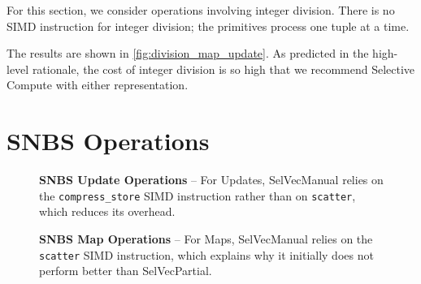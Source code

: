 \documentclass[12pt]{cmuthesis}
\begin{document}
For this section, we consider operations involving integer division. There is no SIMD instruction for integer division; the primitives process one tuple at a time.

The results are shown in \cref{fig:division_map_update}. As predicted in the high-level rationale, the cost of integer division is so high that we recommend Selective Compute with either representation.
\section{SNBS Operations}
\label{snbs_section}
\begin{figure}[t!]
    \centering
    \caption{\textbf{SNBS Update Operations} -- For Updates, SelVecManual relies on the \texttt{compress\_store} SIMD instruction rather than on \texttt{scatter}, which reduces its overhead.}
    \label{fig:snbs_update}
\end{figure}

\begin{figure}[t!]
    \centering
    \caption{\textbf{SNBS Map Operations} -- For Maps, SelVecManual relies on the \texttt{scatter} SIMD instruction, which explains why it initially does not perform better than SelVecPartial.}
    \label{fig:snbs_map}
\end{figure}
\end{document}
